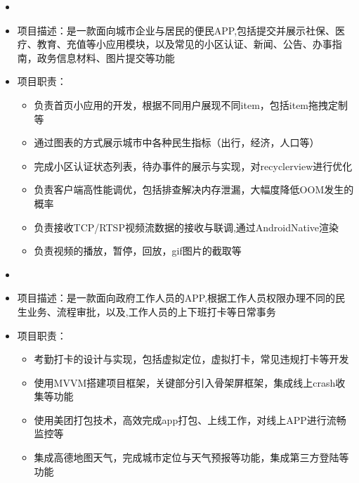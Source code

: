 \begin{itemize}[leftmargin=*]
	\item
	\item 项目描述：是一款面向城市企业与居民的便民APP,包括提交并展示社保、医疗、教育、充值等小应用模块，以及常见的小区认证、新闻、公告、办事指南，政务信息材料、图片提交等功能     
	\item 项目职责：
	{\small
		\begin{itemize}
			\item 负责首页小应用的开发，根据不同用户展现不同item，包括item拖拽定制等
			\item 通过图表的方式展示城市中各种民生指标（出行，经济，人口等）
			\item 完成小区认证状态列表，待办事件的展示与实现，对recyclerview进行优化
			\item 负责客户端高性能调优，包括排查解决内存泄漏，大幅度降低OOM发生的概率
			\item 负责接收TCP/RTSP视频流数据的接收与联调,通过AndroidNative渲染
			\item 负责视频的播放，暂停，回放，gif图片的截取等
		\end{itemize}
	}
	\item
	\item 项目描述：是一款面向政府工作人员的APP,根据工作人员权限办理不同的民生业务、流程审批，以及,工作人员的上下班打卡等日常事务
	\item 项目职责：
	{\small
		\begin{itemize}
			\item 考勤打卡的设计与实现，包括虚拟定位，虚拟打卡，常见违规打卡等开发
			\item 使用MVVM搭建项目框架，关键部分引入骨架屏框架，集成线上crash收集等功能
			\item 使用美团打包技术，高效完成app打包、上线工作，对线上APP进行流畅监控等
			\item 集成高德地图天气，完成城市定位与天气预报等功能，集成第三方登陆等功能	
		\end{itemize}
	}
\end{itemize}